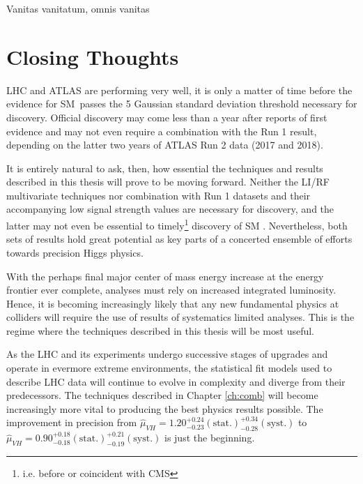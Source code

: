 \begin{savequote}[75mm]
Vanitas vanitatum, omnis vanitas
\end{savequote}

\chapter{Closing Thoughts}
\label{ch:conclusion}
 LHC and ATLAS are performing very well, it is only a matter of time before the evidence for SM \vhbb\,passes the 5 Gaussian standard deviation threshold necessary for discovery.  Official discovery may come less than a year after reports of first evidence and may not even require a combination with the Run 1 result, depending on the latter two years of ATLAS Run 2 data (2017 and 2018).

It is entirely natural to ask, then, how essential the techniques and results described in this thesis will prove to be moving forward.  Neither the LI/RF multivariate techniques nor combination with Run 1 datasets and their accompanying low signal strength values are necessary for discovery, and the latter may not even be essential to timely\footnote{i.e. before or coincident with CMS} discovery of SM \vhbb.  Nevertheless, both sets of results hold great potential as key parts of a concerted ensemble of efforts towards precision Higgs physics.

With the perhaps final major center of mass energy increase at the energy frontier ever complete, analyses must rely on increased integrated luminosity.  Hence, it is becoming increasingly likely that any new fundamental physics at colliders will require the use of results of systematics limited analyses.  This is the regime where the techniques described in this thesis will be most useful.

As the LHC and its experiments undergo successive stages of upgrades and operate in evermore extreme environments, the statistical fit models used to describe LHC data will continue to evolve in complexity and diverge from their predecessors.  The techniques described in Chapter \ref{ch:comb} will become increasingly more vital to producing the best physics results possible.  The improvement in precision from $\hat{\mu}_{VH}=1.20^{+0.24}_{-0.23}(\textrm{stat.})^{+0.34}_{-0.28}(\textrm{syst.})$ to $\hat{\mu}_{VH}=0.90^{+0.18}_{-0.18}(\textrm{stat.})^{+0.21}_{-0.19}(\textrm{syst.})$ is just the beginning.

